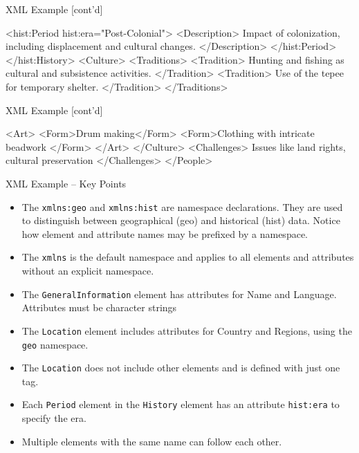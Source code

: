\documentclass[ignorenonframetext,xcolor=x11names]{beamer}
\begin{document}
\begin{frame}[label=full,fragile]{XML Example \small [cont'd]}
\begin{xmlcode}
        <hist:Period hist:era="Post-Colonial">
            <Description>
                Impact of colonization, 
                including displacement and 
                cultural changes.
            </Description>
        </hist:Period>
    </hist:History>
    <Culture>
        <Traditions>
            <Tradition>
                Hunting and fishing as cultural 
                and subsistence activities.
            </Tradition>
            <Tradition>
                Use of the tepee for temporary 
                shelter.
            </Tradition>
        </Traditions>
\end{xmlcode}
\end{frame}

\begin{frame}[label=full,fragile]{XML Example \small [cont'd]}
\begin{xmlcode}
        <Art>
            <Form>Drum making</Form>
            <Form>Clothing with intricate beadwork
            </Form>
        </Art>
    </Culture>
    <Challenges>
        Issues like land rights, cultural preservation
    </Challenges>
</People>
\end{xmlcode}
\end{frame}

\begin{frame}[label=full]{XML Example -- Key Points}
\small
\begin{itemize}
\item The \texttt{xmlns:geo} and \texttt{xmlns:hist} are namespace declarations. They are used to distinguish between geographical (geo) and historical (hist) data. Notice how element and attribute names may be prefixed by a namespace. 
\item The \texttt{xmlns} is the default namespace and applies to all elements and attributes without an explicit namespace.
\item The \texttt{GeneralInformation} element has attributes for Name and Language. Attributes must be character strings
\item The \texttt{Location} element includes attributes for Country and Regions, using the \texttt{geo} namespace.
\item The \texttt{Location} does not include other elements and is defined with just one tag.
\item Each \texttt{Period} element in the \texttt{History} element has an attribute \texttt{hist:era} to specify the era.
\item Multiple elements with the same name can follow each other.
\end{itemize}
\end{frame}
\end{document}
